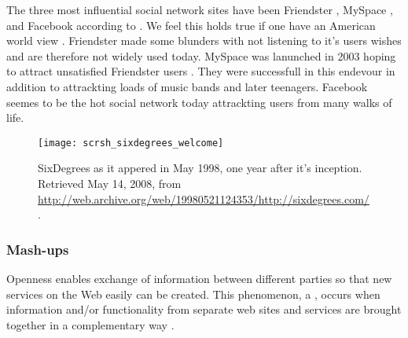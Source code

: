 The three most influential social network sites have been Friendster%
,
MySpace%
,
and Facebook%
according to \citet{boyd07}. We feel this holds true if
one have an American world view%
.
Friendster made some blunders with not listening to it's users
wishes and are therefore not widely used today. MySpace was lanunched in
2003 hoping to attract unsatisfied Friendster users \citep{body07}.
They were successfull in this endevour in addition to attrackting loads of
music bands and later teenagers.
Facebook seemes to be the hot social network today%
attrackting users from many walks of life.

\begin{figure}
  \centering
  \texttt{[image: scrsh\_sixdegrees\_welcome]}
  \caption[SixDegrees Welcome Page]{
    SixDegrees as it appered in May 1998, one year after it's
    inception. Retrieved May 14, 2008, from
    \url{http://web.archive.org/web/19980521124353/http://sixdegrees.com/}.
  }
  \label{figure:scrsh.sixdegrees.welcome}
\end{figure}

\subsubsection{Mash-ups}
Openness enables exchange of information between
different parties so that new services on the Web easily can be created.
This phenomenon, a %
,
occurs when information and/or functionality from separate web sites and
services are brought together in a complementary way
\citep[]{murugesan07}.

